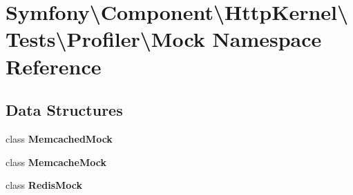 \section{Symfony\textbackslash{}Component\textbackslash{}Http\+Kernel\textbackslash{}Tests\textbackslash{}Profiler\textbackslash{}Mock Namespace Reference}
\label{namespace_symfony_1_1_component_1_1_http_kernel_1_1_tests_1_1_profiler_1_1_mock}
\subsection*{Data Structures}
\begin{DoxyCompactItemize}
\item 
class {\bf Memcached\+Mock}
\item 
class {\bf Memcache\+Mock}
\item 
class {\bf Redis\+Mock}
\end{DoxyCompactItemize}
